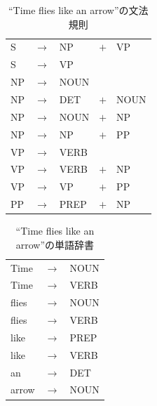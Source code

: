 \documentclass[uplatex, dvipdfmx, a4paper, twocolumn]{jsarticle}
\begin{document}
    \begin{table}[htb]
      \centering
      \caption{``Time flies like an arrow''の文法規則}
      \label{tab:syntax_flies}
      \begin{tabular}{l c l c l} \hline
        S & $\to$ & NP & $+$ & VP \\
        S & $\to$ & VP & & \\
        NP & $\to$ & NOUN & & \\
        NP & $\to$ & DET & $+$ & NOUN \\
        NP & $\to$ & NOUN & $+$ & NP \\
        NP & $\to$ & NP & $+$ & PP \\
        VP & $\to$ & VERB & & \\
        VP & $\to$ & VERB & $+$ & NP \\
        VP & $\to$ & VP & $+$ & PP \\
        PP & $\to$ & PREP & $+$ & NP \\ \hline
      \end{tabular}
    \end{table}
    \begin{table}[htb]
      \centering
      \caption{``Time flies like an arrow''の単語辞書}
      \label{tab:dict_flies}
      \begin{tabular}{l c l} \hline
        Time & $\to$ & NOUN \\
        Time & $\to$ & VERB \\
        flies & $\to$ & NOUN \\
        flies & $\to$ & VERB \\
        like & $\to$ & PREP \\
        like & $\to$ & VERB \\
        an & $\to$ & DET \\
        arrow & $\to$ & NOUN \\ \hline
      \end{tabular}
    \end{table}
\end{document}
